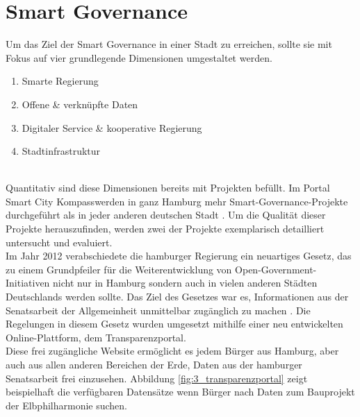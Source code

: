 \section{Smart Governance}

Um das Ziel der Smart Governance in einer Stadt zu erreichen, sollte sie mit Fokus auf vier grundlegende Dimensionen umgestaltet werden.
\begin{enumerate}
	\item Smarte Regierung
	\item Offene \& verknüpfte Daten
	\item Digitaler Service \& kooperative Regierung
	\item Stadtinfrastruktur
\end{enumerate}
\autocite[14]{Fuetterer.2020}
\\ Quantitativ sind diese Dimensionen bereits mit Projekten befüllt. Im Portal \glqq Smart City Kompass\grqq\space werden in ganz Hamburg mehr Smart-Governance-Projekte durchgeführt als in jeder anderen deutschen Stadt \autocite{SmartCityKompass.2020}. Um die Qualität dieser Projekte herauszufinden, werden zwei der Projekte exemplarisch detailliert untersucht und evaluiert.
\\ Im Jahr 2012 verabschiedete die hamburger Regierung ein neuartiges Gesetz, das zu einem Grundpfeiler für die Weiterentwicklung von Open-Government-Initiativen nicht nur in Hamburg sondern auch in vielen anderen Städten Deutschlands werden sollte. Das Ziel des Gesetzes war es, Informationen aus der Senatsarbeit der Allgemeinheit unmittelbar zugänglich zu machen \autocite{Senat.2012}. Die Regelungen in diesem Gesetz wurden umgesetzt mithilfe einer neu entwickelten Online-Plattform, dem \glqq Transparenzportal\grqq.
\\ Diese frei zugängliche Website ermöglicht es jedem Bürger aus Hamburg, aber auch aus allen anderen Bereichen der Erde, Daten aus der hamburger Senatsarbeit frei einzusehen. Abbildung \ref{fig:3_transparenzportal} zeigt beispielhaft die verfügbaren Datensätze wenn Bürger nach Daten zum Bauprojekt der Elbphilharmonie suchen.

